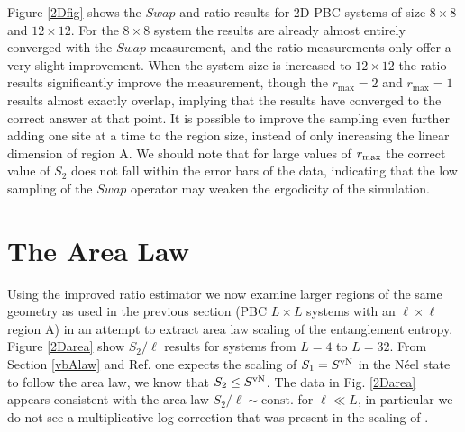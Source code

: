 Figure \ref{2Dfig} shows the $Swap$ and ratio results for 2D PBC systems of size $8 \times 8$ and $12 \times 12$.
For the $8\times 8$ system the results are already almost entirely converged with the $Swap$ measurement, and the ratio measurements only offer a very slight improvement.
	When the system size is increased to $12 \times 12$ the ratio results significantly improve the measurement, though the $r_{\max} = 2$ and $r_{\max} = 1$ results almost exactly overlap, implying that the results have converged to the correct answer at that point.
	It is possible to improve the sampling even further adding one site at a time to the region size, instead of only increasing the linear dimension of region A.
	We should note that for large values of $r_{\rm max}$ the correct value of $S_2$ does not fall within the error bars of the data, indicating that the low sampling of the $Swap$ operator may weaken the ergodicity of the simulation.

\section{The Area Law}

Using the improved ratio estimator we now examine larger regions of the same geometry as used in the previous section (PBC $L \times L$ systems with an $\ell \times\ell$ region A) in an attempt to extract area law scaling of the entanglement entropy.
Figure \ref{2Darea} show $S_2/\ell$ results for systems from $L=4$ to $L=32$.
From Section \ref{vbAlaw} and Ref. \cite{PRL1} one expects the scaling of $S_1 = S^{\text{vN}}$ in the N\'eel state to follow the area law, we know that $S_2 \le S^{\text{vN}}$.
The data in Fig. \ref{2Darea} appears consistent with the area law $S_2/\ell \sim \text{const.}$ for $\ell \ll L$, in particular we do not see a multiplicative log correction that was present in the scaling of \vb \cite{Alet, Chh}. 

